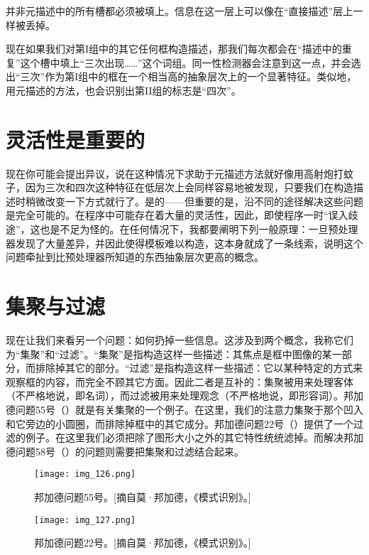 并非元描述中的所有槽都必须被填上。信息在这一层上可以像在“直接描述”层上一样被丢掉。

现在如果我们对第I组中的其它任何框构造描述，那我们每次都会在“描述中的重复”这个槽中填上“三次出现……”这个词组。同一性检测器会注意到这一点，并会选出“三次”作为第I组中的框在一个相当高的抽象层次上的一个显著特征。类似地，用元描述的方法，也会识别出第II组的标志是“四次”。

\section{灵活性是重要的}

现在你可能会提出异议，说在这种情况下求助于元描述方法就好像用高射炮打蚊子，因为三次和四次这种特征在低层次上会同样容易地被发现，只要我们在构造描述时稍微改变一下方式就行了。是的——但重要的是，沿不同的途径解决这些问题是完全可能的。在程序中可能存在着大量的灵活性，因此，即使程序一时“误入歧途”，这也是不足为怪的。在任何情况下，我都要阐明下列一般原理：一旦预处理器发现了大量差异，并因此使得模板难以构造，这本身就成了一条线索，说明这个问题牵扯到比预处理器所知道的东西抽象层次更高的概念。

\section{集聚与过滤}

现在让我们来看另一个问题：如何扔掉一些信息。这涉及到两个概念，我称它们为“集聚”和“过滤”。“集聚”是指构造这样一些描述：其焦点是框中图像的某一部分，而排除掉其它的部分。“过滤”是指构造这样一些描述：它以某种特定的方式来观察框的内容，而完全不顾其它方面。因此二者是互补的：集聚被用来处理客体（不严格地说，即名词），而过滤被用来处理观念（不严格地说，即形容词）。邦加德问题55号（）就是有关集聚的一个例子。在这里，我们的注意力集聚于那个凹入和它旁边的小圆圈，而排除掉框中的其它成分。邦加德问题22号（）提供了一个过滤的例子。在这里我们必须把除了图形大小之外的其它特性统统滤掉。而解决邦加德问题58号（）的问题则需要把集聚和过滤结合起来。

\begin{figure}
\texttt{[image: img\_126.png]}
\caption[邦加德问题55号。]
  {邦加德问题55号。[摘自莫·邦加德，《模式识别》。] }
\end{figure}

\begin{figure}
\texttt{[image: img\_127.png]}
\caption[邦加德问题22号。]
  {邦加德问题22号。[摘自莫·邦加德，《模式识别》。] }
\end{figure}

